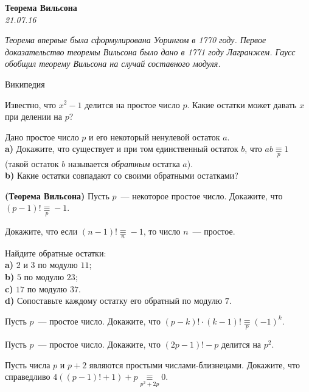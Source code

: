 \begin{center}
\textbf{\Large Теорема Вильсона}\\
\textit{21.07.16}
\end{center}

\epigraph{\it Теорема впервые была сформулирована Уорингом в 1770 году. Первое доказательство теоремы Вильсона было дано в 1771 году Лагранжем. Гаусс обобщил теорему Вильсона на случай составного модуля.}{Википедия}

\begin{problems}
\item Известно, что $x^2-1$ делится на простое число $p$. Какие остатки может давать $x$ при делении на $p$?

\item Дано простое число $p$  и его некоторый ненулевой остаток $a$.\\
\textbf{a)} Докажите, что существует и при том единственный остаток $b$, что $ab \mathop{\equiv}\limits_p 1$ (такой остаток $b$ называется \textit{обратным} остатка $a$).\\
\textbf{b)} Какие остатки совпадают со своими обратными остатками?

\item \textbf{(Теорема Вильсона)} Пусть $p$~--- некоторое простое число. Докажите, что $(p-1)! \mathop{\equiv}\limits_p -1$.
\item Докажите, что если $(n-1)! \mathop{\equiv}\limits_n -1$, то число $n$~--- простое.
 
\item Найдите обратные остатки:\\ 
\textbf{a)} $2$ и $3$ по модулю $11$; \\
\textbf{b)} $5$ по модулю $23$;\\
\textbf{c)} $17$ по модулю $37$.\\
\textbf{d)} Сопоставьте каждому остатку его обратный по модулю $7$. 

\item Пусть $p$~--- простое число. Докажите, что  $(p-k)! \cdot (k-1)! \mathop{\equiv}\limits_p (-1)^k$.

\item Пусть $p$~--- простое число. Докажите, что $(2p-1)!-p$ делится на $p^2$. 

\item Пусть числа $p$ и $p+2$ являются простыми числами-близнецами. Докажите, что справедливо   $4((p-1)!+1)+p\mathop{\equiv}\limits_{p^2+2p} 0$.


\end{problems}
